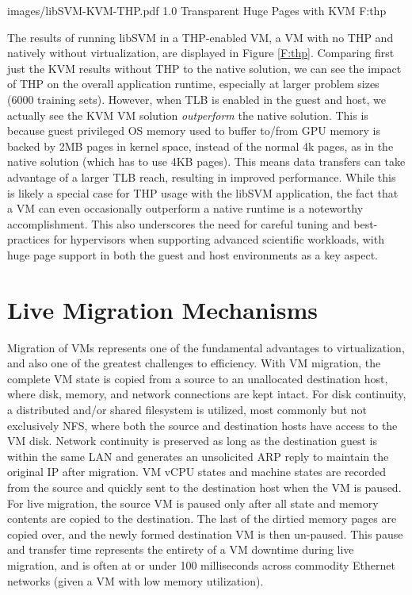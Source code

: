   {images/libSVM-KVM-THP.pdf}
  {1.0}
  {Transparent Huge Pages with KVM}
  {F:thp}


The results of running libSVM in a THP-enabled VM, a VM with no THP and natively without virtualization, are displayed in Figure \ref{F:thp}.  Comparing first just the KVM results without THP to the native solution, we can see the impact of THP on the overall application runtime, especially at larger problem sizes (6000 training sets). However, when TLB is enabled in the guest and host, we actually see the KVM VM solution \emph{outperform} the native solution. This is because guest privileged OS memory used to buffer to/from GPU memory is backed by 2MB pages in kernel space, instead of the normal 4k pages, as in the native solution (which has to use 4KB pages). This means data transfers can take advantage of a larger TLB reach, resulting in improved performance.  While this is likely a special case for THP usage with the libSVM application, the fact that a VM can even occasionally outperform a native runtime is a noteworthy accomplishment. This also underscores the need for careful tuning and best-practices for hypervisors when supporting advanced scientific workloads, with huge page support in both the guest and host environments as a key aspect. 

\section{Live Migration Mechanisms}


Migration of VMs represents one of the fundamental advantages to virtualization, and also one of the greatest challenges to efficiency.  With VM migration, the complete VM state is copied from a source to an unallocated destination host, where disk, memory, and network connections are kept intact. For disk continuity, a distributed and/or shared filesystem is utilized, most commonly but not exclusively NFS, where both the source and destination hosts have access to the VM disk.  Network continuity is preserved as long as the destination guest is within the same LAN and generates an unsolicited ARP reply to maintain the original IP after migration.  VM vCPU states and machine states are recorded from the source and quickly sent to the destination host when the VM is paused. For live migration, the source VM is paused only after all state and memory contents are copied to the destination. The last of the dirtied memory pages are copied over, and the newly formed destination VM is then un-paused.  This pause and transfer time represents the entirety of a VM downtime during live migration, and is often at or under 100 milliseconds across commodity Ethernet networks (given a VM with low memory utilization).  

